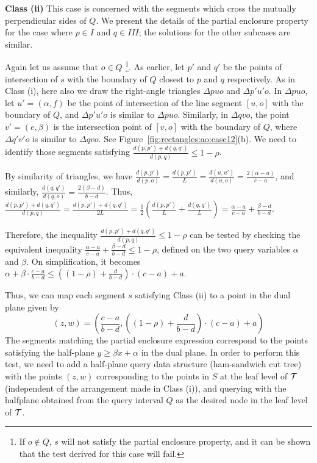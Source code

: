 {\bf Class (ii)} This case is concerned with the segments which cross 
the mutually perpendicular sides of $Q$. We present the details 
of the partial enclosure property for the case where $p \in I$ 
and $q \in III$; the solutions for the other subcases  
are similar. 

Again let us assume that $o \in Q$ \footnote{If $o \not\in Q$, $s$ 
will not satisfy the partial enclosure property, and it can be shown 
that the test derived for this case will fail.}. 
As earlier, let $p'$ 
and $q'$ be the points of intersection of $s$ with the boundary of 
$Q$ closest to $p$ and $q$ respectively. As in Class (i), here also 
we draw the 
right-angle triangles $\Delta p u o$ and  $\Delta p'u'o$. In 
$\Delta p u o$, let $u' = (\alpha, f)$ be the point of intersection 
of the line segment $[u, o]$ with the boundary of $Q$, and 
$\Delta p'u'o$ is similar to $\Delta p u o$. Similarly, in 
$\Delta q v o$, the point $v' = (e, \beta)$ 
is the intersection point of $[v, o]$ with the boundary of $Q$, 
where $\Delta q' v' o$ is similar to $\Delta q v o$. See 
Figure~\ref{fig:rectangles:ao:case12}(b). We need to identify those 
segments satisfying $\frac{d(p, p')+d(q, q')}{d(p, q)} \leq 1-\rho$. 

By similarity of triangles, we have  $\frac{d(p, p')}{d(p, o)} = 
\frac{d(p, p')}{L} = \frac{d(u, u')}{d(u, o)} = \frac{2(\alpha - a)}
{c - a}$, and similarly, $\frac{d(q, q')}{d(q, o)} = \frac{2(\beta - d)}{b - 
d}$. 
Thus,
$\frac{d(p, p') + d(q, q')}{d(p, q)}=\frac{d(p, p') + d(q, q')}{2L} 
=\frac{1}{2} \left (\frac{d(p, p')}{L} + \frac{d(q, q')}{L} \right) 
= \frac{\alpha - a}{c - a} + \frac{\beta - d}{b - d}$.

Therefore, the inequality $\frac{d(p, p') + d(q, q')}{d(p, q)} 
\leq 1 - \rho$ can be tested by checking the equivalent inequality 
$\frac{\alpha - a}{c - a} + \frac{\beta - d}{b - d} \leq 1 - \rho$, 
defined on the two query variables $\alpha$ and $\beta$. On 
simplification, it becomes $\alpha + \beta \cdot \frac{c-a}{b-d} \leq 
\left ( (1 - \rho) + \frac{d}{b-d} \right ) \cdot (c-a) + a$.

Thus, we can map each segment $s$ satisfying Class (ii) to a point in the dual 
plane
given by
\[ (z,w)=
\left(\frac{c-a}{b-d}, \left ( (1 - \rho) + \frac{d}{b-d} \right ) \cdot (c-a) + 
a \right )
\]
The segments matching the 
partial enclosure expression correspond to the points satisfying the 
half-plane $y \geq \beta x + \alpha$ in the dual plane. In order 
to perform this test, we need to add a half-plane query data structure
(ham-sandwich cut tree) \cite{chan2012} with the points $(z,w)$ 
corresponding to the 
points in $S$ at the leaf level of $\cal T$ (independent of the arrangement 
made in Class (i)), and querying with the halfplane obtained from the query 
interval $Q$ as the desired node in the leaf level of $\cal T$. 

